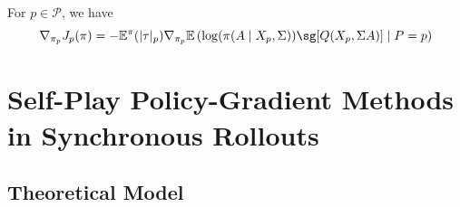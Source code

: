\documentclass[12pt, a4paper]{article}
\begin{document}
\begin{theorem}\label{thm:policy-gradient-games}
  For $p \in \mathcal{P}$, we have
  \begin{equation}\label{eq:policy-gradient-games}
    \nabla_{\pi_p} J_p(\pi)
    = - \mathbb{E}^\pi(|\tau|_{p}) \nabla_{\pi_p} \mathbb{E}\left(\log(\pi(A \mid X_p, \Sigma)) \sg[Q(X_p, \Sigma A)] \mid P = p\right)
  \end{equation}
\end{theorem}

\section{Self-Play Policy-Gradient Methods in Synchronous Rollouts}\label{sec:synchronous-pg}

\subsection{Theoretical Model}\label{subsec:pg-theoretical-model}
\end{document}
